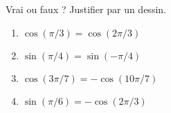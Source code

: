 
\begin{exercice}\label{exosmath-0367}

    Vrai ou faux ? Justifier par un dessin.
    \begin{multicols}{2}
        \begin{enumerate}
            \item
                \( \cos(\pi/3)=\cos(2\pi/3)\)
            \item
                \( \sin(\pi/4)=\sin(-\pi/4)\)
            \item
                \( \cos(3\pi/7)=-\cos(10\pi/7)\)
            \item
                \( \sin(\pi/6)=-\cos(2\pi/3)\)
        \end{enumerate}
    \end{multicols}

\end{exercice}
